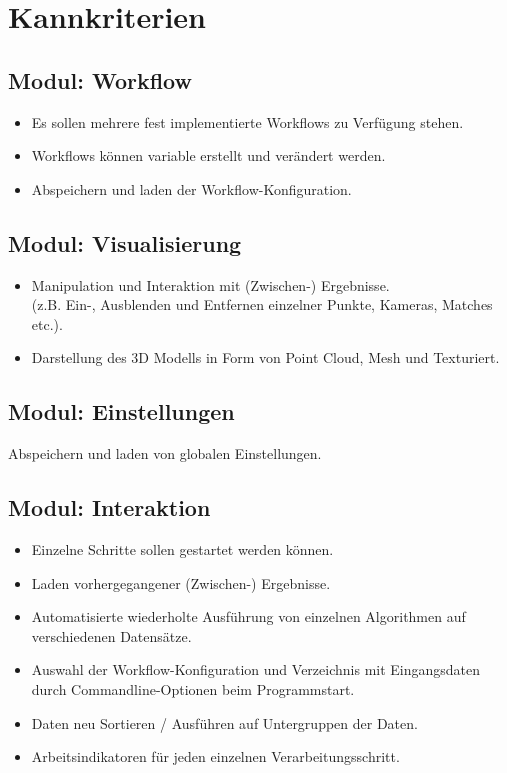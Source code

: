 \section{Kannkriterien}
\subsection{Modul: Workflow}
\begin{itemize}
	\item Es sollen mehrere fest implementierte Workflows zu Verfügung stehen.
	\item Workflows können variable erstellt und verändert werden.
	\item Abspeichern und laden der Workflow-Konfiguration.
\end{itemize}
\subsection{Modul: Visualisierung}
\begin{itemize}
	\item Manipulation und Interaktion mit (Zwischen-) Ergebnisse.\\(z.B. Ein-, Ausblenden und Entfernen einzelner Punkte, Kameras, Matches etc.).
	\item Darstellung des 3D Modells in Form von Point Cloud, Mesh und Texturiert.
\end{itemize}
\subsection{Modul: Einstellungen}
Abspeichern und laden von globalen Einstellungen.
\subsection{Modul: Interaktion}
\begin{itemize}
	\item Einzelne Schritte sollen gestartet werden können.
	\item Laden vorhergegangener (Zwischen-) Ergebnisse.
	\item Automatisierte wiederholte Ausführung von einzelnen Algorithmen auf verschiedenen Datensätze.
	\item Auswahl der Workflow-Konfiguration und Verzeichnis mit Eingangsdaten durch Commandline-Optionen beim Programmstart.
	\item Daten neu Sortieren / Ausführen auf Untergruppen der Daten.
	\item Arbeitsindikatoren für jeden einzelnen Verarbeitungsschritt.
\end{itemize}

